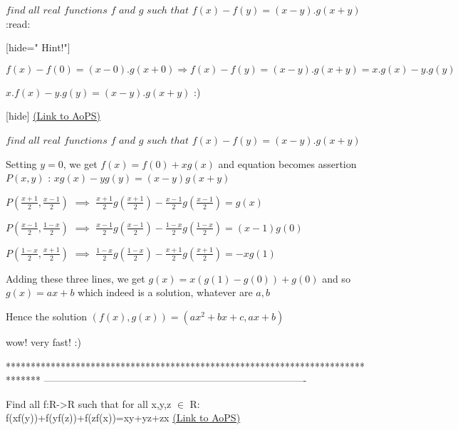 \begin{problem}
	$ find $  $ all $  $ real $  $ functions $  $ f $ $ and $ $ g $  $ such $ $ that $ $ f(x)-f(y)=(x-y).g(x+y) $  :read:

[hide=" Hint!"]

$ f(x)-f(0) =(x-0).g(x+0) \Rightarrow f(x)-f(y)=(x-y).g(x+y) =x.g(x)-y.g(y) $

$ x.f(x) - y.g(y) = (x-y).g(x+y) $ :)

[\/hide]
	\flushright \href{https://artofproblemsolving.com/community/c6h572695}{(Link to AoPS)}
\end{problem}



\begin{solution}
	\begin{tcolorbox}$ find $  $ all $  $ real $  $ functions $  $ f $ $ and $ $ g $  $ such $ $ that $ $ f(x)-f(y)=(x-y).g(x+y) $\end{tcolorbox}
Setting $y=0$, we get $f(x)=f(0)+xg(x)$ and equation becomes assertion $P(x,y)$ : $xg(x)-yg(y)=(x-y)g(x+y)$

$P(\frac{x+1}2,\frac{x-1}2)$ $\implies$ $\frac{x+1}2g(\frac{x+1}2)-\frac{x-1}2g(\frac{x-1}2)=g(x)$

$P(\frac{x-1}2,\frac{1-x}2)$ $\implies$ $\frac{x-1}2g(\frac{x-1}2)-\frac{1-x}2g(\frac{1-x}2)=(x-1)g(0)$

$P(\frac{1-x}2,\frac{x+1}2)$ $\implies$ $\frac{1-x}2g(\frac{1-x}2)-\frac{x+1}2g(\frac{x+1}2)=-xg(1)$

Adding these three lines, we get $g(x)=x(g(1)-g(0))+g(0)$ and so $g(x)=ax+b$ which indeed is a solution, whatever are $a,b$

Hence the solution $\boxed{(f(x),g(x))=(ax^2+bx+c,ax+b)}$
\end{solution}



\begin{solution}
	wow! very fast! :)
\end{solution}
*******************************************************************************
-------------------------------------------------------------------------------

\begin{problem}
	Find all f:R->R such that for all x,y,z $\in$ R:
f(xf(y))+f(yf(z))+f(zf(x))=xy+yz+zx
	\flushright \href{https://artofproblemsolving.com/community/c6h572999}{(Link to AoPS)}
\end{problem}



